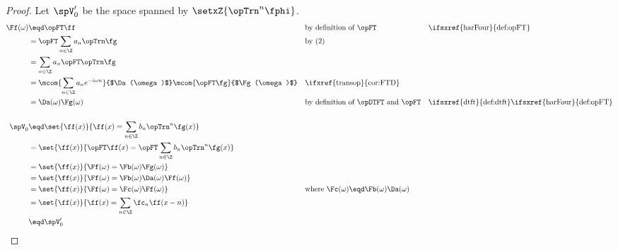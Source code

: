\begin{proof}
Let $\spV_0'$ be the space spanned by $\setxZ{\opTrn^n\fphi}$.
\begin{align*}
  \Ff(\omega)
    &\eqd \opFT\ff
    &&    \text{by definition of $\opFT$}
    &&    \text{\ifsxref{harFour}{def:opFT}}
  \\&=    \opFT\sum_{n\in\Z} a_n \opTrn\fg
    &&    \text{by (2)}
  \\&=    \sum_{n\in\Z} a_n \opFT\opTrn\fg
  \\&=    \mcom{\sum_{n\in\Z} a_n e^{-i\omega n}}{$\Da(\omega)$}\mcom{\opFT\fg}{$\Fg(\omega)$}
    &&    \text{\ifxref{transop}{cor:FTD}}
  \\&=    \Da(\omega)\Fg(\omega)
    &&    \text{by definition of $\opDTFT$ and $\opFT$}
    &&    \text{\ifsxref{dtft}{def:dtft}\ifsxref{harFour}{def:opFT}}
\\
\\
  \spV_0
    &\eqd \set{\ff(x)}{\ff(x)=\sum_{n\in\Z} b_n \opTrn^n\fg(x)}
  \\&=    \set{\ff(x)}{\opFT\ff(x)=\opFT\sum_{n\in\Z} b_n \opTrn^n\fg(x)}
  \\&=    \set{\ff(x)}{\Ff(\omega)=\Fb(\omega) \Fg(\omega) }
  \\&=    \set{\ff(x)}{\Ff(\omega)=\Fb(\omega) \Da(\omega) \Ff(\omega) }
  \\&=    \set{\ff(x)}{\Ff(\omega)=\Fc(\omega) \Ff(\omega) }
    &&    \text{where $\Fc(\omega)\eqd\Fb(\omega)\Da(\omega)$}
  \\&=    \set{\ff(x)}{\ff(x)=\sum_{n\in\Z} \fc_{n} \ff(x-n) }
  \\&\eqd \spV_0'
\end{align*}
\end{proof}


